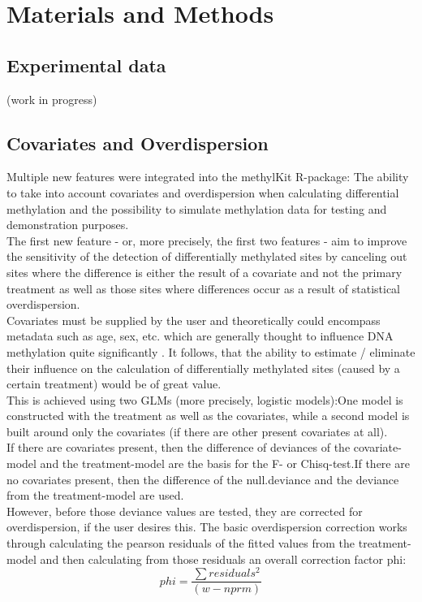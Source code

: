 \section{Materials and Methods}
\subsection{Experimental data}

(work in progress)

\subsection{Covariates and Overdispersion}

Multiple new features were integrated into the methylKit R-package: The ability to take into account covariates and overdispersion when calculating differential methylation and the possibility to simulate methylation data for testing and demonstration purposes.\\
The first new feature - or, more precisely, the first two features - aim to  improve the sensitivity of the detection of differentially methylated sites by canceling out sites where the difference is either the result of a covariate and not the primary treatment as well as those sites where differences occur as a result of statistical overdispersion.\\
Covariates must be supplied by the user and theoretically could encompass metadata such as age, sex, etc. which are generally thought to influence DNA methylation quite significantly \cite{24561809}. It follows, that the ability to estimate / eliminate their influence on the calculation of differentially methylated sites (caused by a certain treatment) would be of great value.\\
This is achieved using two GLMs (more precisely, logistic models):One model is constructed with the treatment as well as the covariates, while a second model is built around only the covariates (if there are other present covariates at all).\\
If there are covariates present, then the difference of deviances of the covariate-model and the treatment-model are the basis for the F- or Chisq-test.If there are no covariates present, then the difference of the null.deviance and the deviance from the treatment-model are used.\\
However, before those deviance values are tested, they are corrected for overdispersion, if the user desires this. The basic overdispersion correction works through calculating the pearson residuals of the fitted values from the treatment-model and then calculating from those residuals an overall correction factor phi:
\[phi = \frac{\sum{residuals^2}}{(w - nprm)}\]

